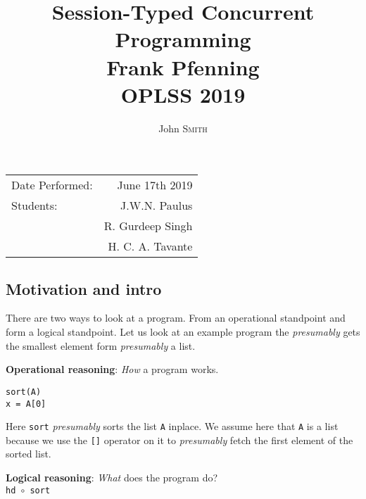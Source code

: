 \documentclass{article}
\title{Session-Typed Concurrent Programming \\ Frank Pfenning \\ OPLSS 2019} %
\author{John \textsc{Smith}} %
\begin{document}
\maketitle %

\begin{center}
\begin{tabular}{l r}
Date Performed: & June 17th 2019 \\ %
Students: & J.W.N. Paulus  \\
& R. Gurdeep Singh \\ %
& H. C. A. Tavante %
\end{tabular}
\end{center}





\subsection*{Motivation and intro}

There are two ways to look at a program. From an operational standpoint
and form a logical standpoint. Let us look at an example program the
\emph{presumably} gets the smallest element form \emph{presumably} a
list.

\textbf{Operational reasoning}: \emph{How} a program works.

\begin{verbatim}
sort(A)
x = A[0]
\end{verbatim}

Here \texttt{sort} \emph{presumably} sorts the list \texttt{A} inplace.
We assume here that \texttt{A} is a list because we use the
\texttt{{[}{]}} operator on it to \emph{presumably} fetch the first
element of the sorted list.

\textbf{Logical reasoning}: \emph{What} does the program do?\\

\verb|hd |\(\circ\)\verb| sort| \\
\end{document}
